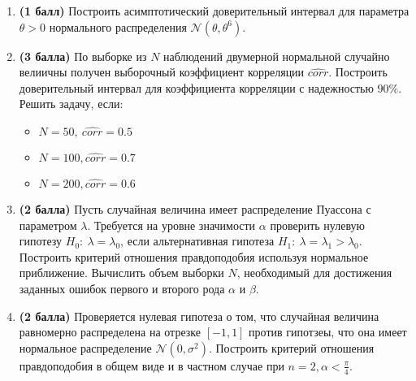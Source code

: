 \documentclass{assignment}
\begin{document}
\begin{enumerate}
    \item \textbf{(1 балл)} Построить асимптотический доверительный интервал для параметра $\theta > 0$ нормального распределения $\mathcal{N}(\theta, \theta^6)$.


    \item \textbf{(3 балла)} По выборке из $N$ наблюдений двумерной нормальной случайно велиичны получен выборочный коэффициент корреляции $\hat{corr}$. Построить доверительный интервал для коэффициента корреляции с надежностью $90\%$. Решить задачу, если: 

    \begin{itemize}
        \item $N = 50,~ \hat{corr} = 0.5$
        \item $N = 100, \hat{corr} = 0.7$
        \item $N = 200, \hat{corr} = 0.6$

    \end{itemize}


    \item \textbf{(2 балла)} Пусть случайная величина имеет распределение Пуассона с параметром $\lambda$. Требуется на уровне значимости $\alpha$ проверить нулевую гипотезу $H_0:~ \lambda = \lambda_0$, если альтернативная гипотеза $H_1:~ \lambda = \lambda_1 > \lambda_0$. Построить критерий отношения правдоподобия используя нормальное приближение. Вычислить объем выборки $N$, необходимый для достижения заданных ошибок первого и второго рода $\alpha$ и $\beta$.

    \item \textbf{(2 балла)} Проверяется нулевая гипотеза о том, что случайная величина равномерно распределена на отрезке $[-1, 1]$ против гипотзеы, что она имеет нормальное распределение $\mathcal{N}(0, \sigma^2)$. Построить критерий отношения правдоподобия в общем виде и в частном случае при $\displaystyle n = 2, \alpha < \frac{\pi}{4}$.
    


\end{enumerate}
\end{document}

